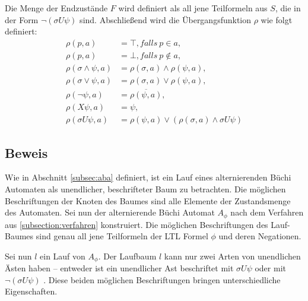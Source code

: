 Die Menge der Endzustände $F$ wird definiert als all jene Teilformeln aus $S$, die in der Form $\lnot(\sigma U\psi)$ sind. Abschließend wird die Übergangsfunktion $\rho$ wie folgt definiert:
\begin{equation}
\label{aba-zu-ltl:transitionsfunktion}
\begin{split}
    \rho(p, a) &= \top, falls \ p \in a,\\
    \rho(p, a) &= \bot, falls \ p \not\in a,\\
    \rho(\sigma \land \psi, a) &= \rho(\sigma, a) \land \rho(\psi, a),\\
    \rho(\sigma \lor \psi, a) &= \rho(\sigma, a) \lor \rho(\psi, a),\\
    \rho(\lnot\psi, a) &= \overline{\rho(\psi, a)},\\
    \rho(X\psi, a) &= \psi,\\
    \rho(\sigma U\psi, a) &= \rho(\psi, a) \lor (\rho(\sigma, a) \land \sigma U\psi)
\end{split}
\end{equation}


\subsection{Beweis}

Wie in Abschnitt \ref{subsec:aba} definiert, ist ein Lauf eines alternierenden Büchi Automaten als unendlicher, beschrifteter Baum zu betrachten. Die möglichen Beschriftungen der Knoten des Baumes sind alle Elemente der Zustandsmenge des Automaten. Sei nun der alternierende Büchi Automat $A_\phi$ nach dem Verfahren aus \ref{subsection:verfahren} konstruiert. Die möglichen Beschriftungen des Lauf-Baumes sind genau all jene Teilformeln der LTL Formel $\phi$ und deren Negationen.

Sei nun $l$ ein Lauf von $A_\phi$. Der Laufbaum $l$ kann nur zwei Arten von unendlichen Ästen haben -- entweder ist ein unendlicher Ast beschriftet mit $\sigma U\psi$ oder mit $\lnot(\sigma U\psi)$ \cite{vardi+96}. Diese beiden möglichen Beschriftungen bringen unterschiedliche Eigenschaften. 

